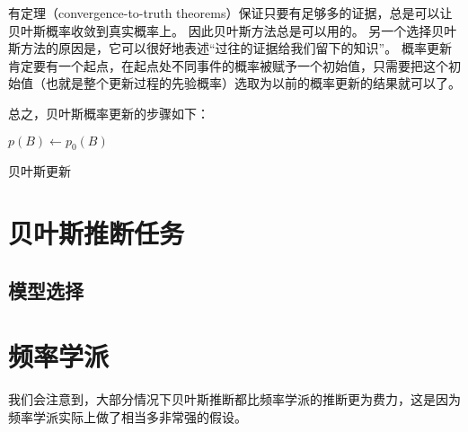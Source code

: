 \documentclass[hyperref, UTF8, a4paper]{ctexart}
\begin{document}
有定理（convergence-to-truth theorems）保证只要有足够多的证据，总是可以让贝叶斯概率收敛到真实概率上。
因此贝叶斯方法总是可以用的。
另一个选择贝叶斯方法的原因是，它可以很好地表述“过往的证据给我们留下的知识”。
概率更新肯定要有一个起点，在起点处不同事件的概率被赋予一个初始值，只需要把这个初始值（也就是整个更新过程的先验概率）选取为以前的概率更新的结果就可以了。

总之，贝叶斯概率更新的步骤如下：

\begin{algorithm}[H]

    \DontPrintSemicolon
    \SetAlgoLined

    
    $p(B) \leftarrow p_0(B)$ \;
    \;

    \caption{贝叶斯更新}
    \label{alg:bayesian-updating}
\end{algorithm}

\section{贝叶斯推断任务}

\subsection{模型选择}

\section{频率学派}

我们会注意到，大部分情况下贝叶斯推断都比频率学派的推断更为费力，这是因为频率学派实际上做了相当多非常强的假设。
\end{document}

